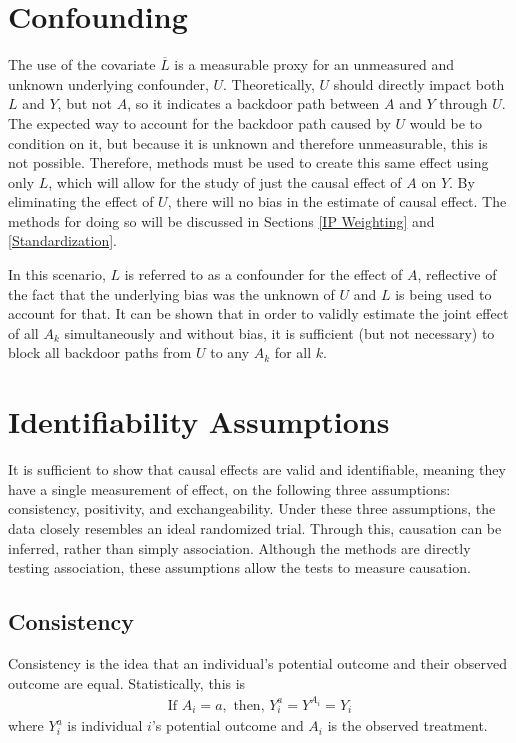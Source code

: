 \section{Confounding} 

The use of the covariate $\overline{L}$ is a measurable proxy for an unmeasured and unknown underlying confounder, $U$.  Theoretically, $U$ should directly impact both $L$ and $Y$, but not $A$, so it indicates a backdoor path between $A$ and $Y$ through $U$.  \cite{wright2015international}  The expected way to account for the backdoor path caused by $U$ would be to condition on it, but because it is unknown and therefore unmeasurable, this is not possible.  Therefore, methods must be used to create this same effect using only $L$, which will allow for the study of just the causal effect of $A$ on $Y$.  By eliminating the effect of $U$, there will no bias in the estimate of causal effect.  The methods for doing so will be discussed in Sections \ref{IP Weighting} and \ref{Standardization}.  

In this scenario, $L$ is referred to as a confounder for the effect of $A$, reflective of the fact that the underlying bias was the unknown of $U$ and $L$ is being used to account for that.  It can be shown that in order to validly estimate the joint effect of all $A_k$ simultaneously and without bias, it is sufficient (but not necessary) to block all backdoor paths from $U$ to any $A_k$ for all $k$.\cite{pearl1995probabilistic}

\section{Identifiability Assumptions} \label{assumptions} 
It is sufficient to show that causal effects are valid and identifiable, meaning they have a single measurement of effect, on the following three assumptions: consistency, positivity, and exchangeability.\cite{cole2009consistency, hernan_robins_2016}   Under these three assumptions, the data closely resembles an ideal randomized trial.  Through this, causation can be inferred, rather than simply association.  Although the methods are directly testing association, these assumptions allow the tests to measure causation.  
 
\subsection{Consistency} 
Consistency is the idea that an individual's potential outcome and their observed outcome are equal\cite{cole2009consistency, hernan_robins_2016}.  Statistically, this is 
\begin{align} 
\text{If  } A_i = a, \text{     then,    } Y_i^a = Y^{A_i} = Y_i 
\end{align} 
where $Y_i^a$ is individual $i$'s potential outcome and $A_i$ is the observed treatment.  


